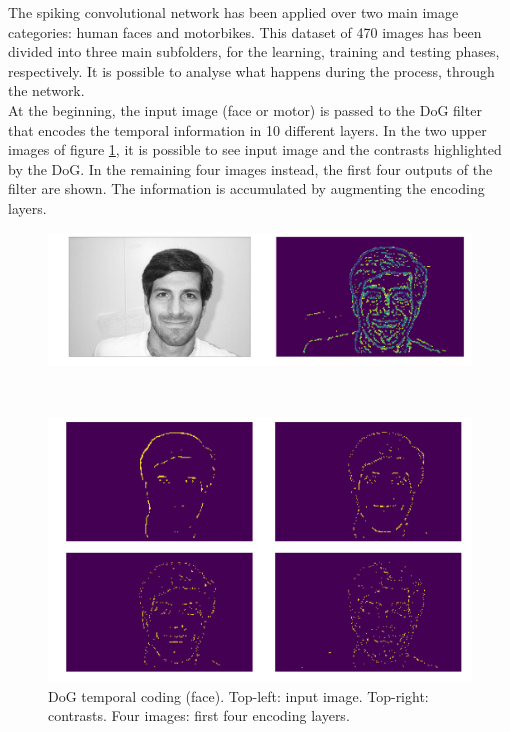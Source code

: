 \documentclass[11pt,a4paper]{scrartcl}
\begin{document}
The spiking convolutional network has been applied over two main image categories: human faces and motorbikes. This dataset of 470 images has been divided into three main subfolders, for the learning, training and testing phases, respectively.
It is possible to analyse what happens during the process, through the network.\\
At the beginning, the input image (face or motor) is passed to the DoG filter that encodes the temporal information in 10 different layers. In the two upper images of figure \ref{fig:face}, it is possible to see input image and the contrasts highlighted by the DoG. In the remaining four images instead, the first four outputs of the filter are shown. The information is accumulated by augmenting the encoding layers.\\
\begin{figure}[h]
	\centering
	\begin{minipage}[b]{\textwidth}
		\includegraphics[width=\textwidth]{images/face_temp}
	\end{minipage}
	\\
	\begin{minipage}[b]{\textwidth}
		\includegraphics[width=\textwidth]{images/face_dog_out}
	\end{minipage}
	\caption{DoG temporal coding (face). Top-left: input image. Top-right: contrasts. Four images: first four encoding layers.}
	\label{fig:face}
\end{figure}\\
\end{document}
